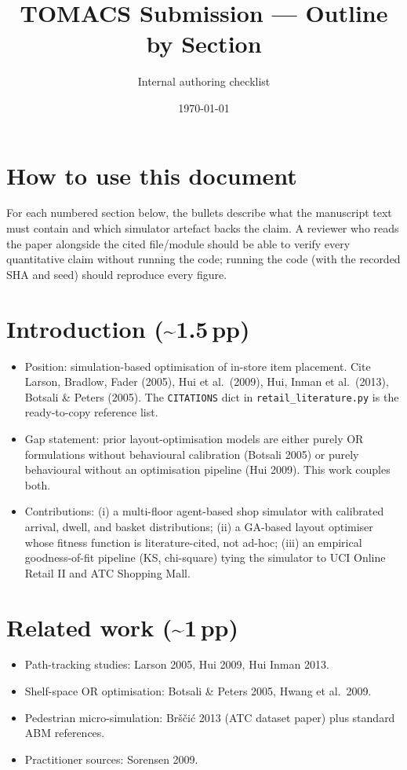 \documentclass[11pt]{article}
\title{TOMACS Submission --- Outline by Section}
\author{Internal authoring checklist}
\date{\today}
\begin{document}
\maketitle

\section*{How to use this document}

For each numbered section below, the bullets describe what the
manuscript text must contain and which simulator artefact backs the
claim. A reviewer who reads the paper alongside the cited file/module
should be able to verify every quantitative claim without running the
code; running the code (with the recorded SHA and seed) should
reproduce every figure.

\section{Introduction (\textasciitilde 1.5\,pp)}
\begin{itemize}[leftmargin=*]
  \item Position: simulation-based optimisation of in-store item
    placement. Cite Larson, Bradlow, Fader (2005), Hui et al.\ (2009),
    Hui, Inman et al.\ (2013), Botsali \& Peters (2005). The
    \texttt{CITATIONS} dict in \texttt{retail\_literature.py} is the
    ready-to-copy reference list.
  \item Gap statement: prior layout-optimisation models are either
    purely OR formulations without behavioural calibration
    (Botsali 2005) or purely behavioural without an optimisation
    pipeline (Hui 2009). This work couples both.
  \item Contributions: (i) a multi-floor agent-based shop simulator
    with calibrated arrival, dwell, and basket distributions;
    (ii) a GA-based layout optimiser whose fitness function is
    literature-cited, not ad-hoc; (iii) an empirical
    goodness-of-fit pipeline (KS, chi-square) tying the simulator to
    UCI Online Retail II and ATC Shopping Mall.
\end{itemize}

\section{Related work (\textasciitilde 1\,pp)}
\begin{itemize}[leftmargin=*]
  \item Path-tracking studies: Larson 2005, Hui 2009, Hui Inman 2013.
  \item Shelf-space OR optimisation: Botsali \& Peters 2005, Hwang
    et al.\ 2009.
  \item Pedestrian micro-simulation: Bršči{\'c} 2013 (ATC dataset
    paper) plus standard ABM references.
  \item Practitioner sources: Sorensen 2009.
\end{itemize}
\end{document}
